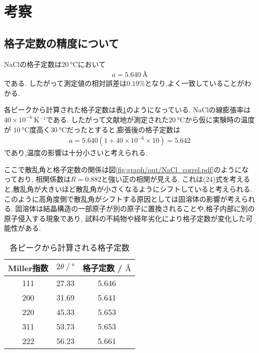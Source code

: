 \section{考察}
\subsection{格子定数の精度について}
NaClの格子定数は$20\ \si{\degreeCelsius}$において
\begin{align}
  a=5.640\ \si{\angstrom}
\end{align}
である.\cite{rikanennpyo}
したがって測定値の相対誤差は$0.19\%$となり,よく一致していることがわかる.

各ピークから計算された格子定数は表\ref{tab:kakupi-ku}のようになっている.
NaClの線膨張率は$40\times10^{-6}\ \si{\kelvin^{-1}}$である.\cite{rikanennpyo}
したがって文献地が測定された$20\ \si{\degreeCelsius}$から仮に実験時の温度が
$10\ \si{\degreeCelsius}$度高く$30\ \si{\degreeCelsius}$だったとすると,膨張後の格子定数は
\begin{align}
  a=5.640(1+40\times10^{-6}\times 10)=5.642
\end{align}
であり,温度の影響は十分小さいと考えられる.

ここで散乱角と格子定数の関係は図\ref{fig:graph/out/NaCl_correl.pdf}のようになっており,
相関係数は$R=0.882$と強い正の相関が見える.
これは(24)式を考えると,散乱角が大きいほど散乱角が小さくなるようにシフトしていると考えられる.
このように高角度側で散乱角がシフトする原因としては固溶体の影響が考えられる.\cite{nakayama}
固溶体は結晶構造の一部原子が別の原子に置換されることや,格子内部に別の原子侵入する現象であり,
試料の不純物や経年劣化により格子定数が変化した可能性がある.
\begin{table}[h]
\caption{各ピークから計算される格子定数}
\label{tab:kakupi-ku}
\centering
  \begin{tabular}{ccc}
  \hline
  Miller指数&$2\theta\ /\ \si{\degree}$&格子定数 / $\si{\angstrom}$\\
  \hline \hline
  111&27.33&5.646\\
  200&31.69&5.641\\
  220&45.33&5.653\\
  311&53.73&5.653\\
  222&56.23&5.661\\
  \hline
  \end{tabular}
\end{table}
